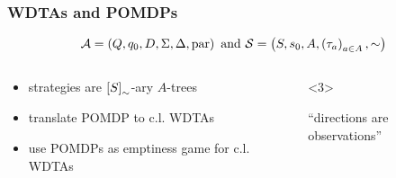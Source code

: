 \documentclass{beamer}
\begin{document}
  \begin{frame}
    \frametitle{\acp{WDTA} and \acp{POMDP}}
    \begin{equation*}
      \mathcal{A} = \left(Q, q_{0}, D, \Sigma, \Delta, \operatorname{par}\right)
      \text{ and }
      \mathcal{S} = \left(S, s_{0}, A, \left(\tau_{a}\right)_{a\in A}, \sim\right)
    \end{equation*}
    \begin{overlayarea}{\textwidth}{0.8\textheight}
      \begin{columns}
        \begin{column}{0.35\textwidth}
          \begin{overlayarea}{\textwidth}{\textheight}
            \begin{itemize}
              \item<2-> strategies are
                $\left[S\right]_{\sim}$-ary $A$-trees
              \item<3-> translate \acs{POMDP} to c.l. \acp{WDTA}
              \item<4-> use \acp{POMDP} as emptiness game for c.l. \acp{WDTA}
            \end{itemize}
          \end{overlayarea}
        \end{column}
        \begin{column}{0.65\textwidth}
          \vspace{-3cm}
          \begin{onlyenv}<3>
            \begin{center}
              \enquote{directions are observations}
            \end{center}

\end{onlyenv}
\end{column}
\end{columns}
\end{overlayarea}
\end{frame}
\end{document}
